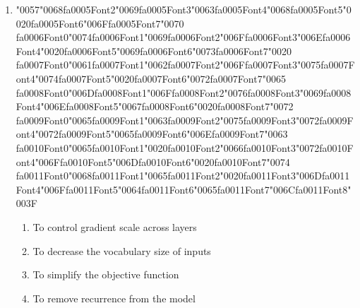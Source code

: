 \documentclass[12pt]{article}
\begin{document}
\begin{enumerate}[label=Q\arabic*.]
 \item {\char"0057}{\char"0068}{\csname fa0005Font2\endcsname\char"0069}{\csname fa0005Font3\endcsname\char"0063}{\csname fa0005Font4\endcsname\char"0068}{\csname fa0005Font5\endcsname\char"0020}{\csname fa0005Font6\endcsname\char"006F}{\csname fa0005Font7\endcsname\char"0070} {\csname fa0006Font0\endcsname\char"0074}{\csname fa0006Font1\endcsname\char"0069}{\csname fa0006Font2\endcsname\char"006F}{\csname fa0006Font3\endcsname\char"006E}{\csname fa0006Font4\endcsname\char"0020}{\csname fa0006Font5\endcsname\char"0069}{\csname fa0006Font6\endcsname\char"0073}{\csname fa0006Font7\endcsname\char"0020} {\csname fa0007Font0\endcsname\char"0061}{\csname fa0007Font1\endcsname\char"0062}{\csname fa0007Font2\endcsname\char"006F}{\csname fa0007Font3\endcsname\char"0075}{\csname fa0007Font4\endcsname\char"0074}{\csname fa0007Font5\endcsname\char"0020}{\csname fa0007Font6\endcsname\char"0072}{\csname fa0007Font7\endcsname\char"0065} {\csname fa0008Font0\endcsname\char"006D}{\csname fa0008Font1\endcsname\char"006F}{\csname fa0008Font2\endcsname\char"0076}{\csname fa0008Font3\endcsname\char"0069}{\csname fa0008Font4\endcsname\char"006E}{\csname fa0008Font5\endcsname\char"0067}{\csname fa0008Font6\endcsname\char"0020}{\csname fa0008Font7\endcsname\char"0072} {\csname fa0009Font0\endcsname\char"0065}{\csname fa0009Font1\endcsname\char"0063}{\csname fa0009Font2\endcsname\char"0075}{\csname fa0009Font3\endcsname\char"0072}{\csname fa0009Font4\endcsname\char"0072}{\csname fa0009Font5\endcsname\char"0065}{\csname fa0009Font6\endcsname\char"006E}{\csname fa0009Font7\endcsname\char"0063} {\csname fa0010Font0\endcsname\char"0065}{\csname fa0010Font1\endcsname\char"0020}{\csname fa0010Font2\endcsname\char"0066}{\csname fa0010Font3\endcsname\char"0072}{\csname fa0010Font4\endcsname\char"006F}{\csname fa0010Font5\endcsname\char"006D}{\csname fa0010Font6\endcsname\char"0020}{\csname fa0010Font7\endcsname\char"0074} {\csname fa0011Font0\endcsname\char"0068}{\csname fa0011Font1\endcsname\char"0065}{\csname fa0011Font2\endcsname\char"0020}{\csname fa0011Font3\endcsname\char"006D}{\csname fa0011Font4\endcsname\char"006F}{\csname fa0011Font5\endcsname\char"0064}{\csname fa0011Font6\endcsname\char"0065}{\csname fa0011Font7\endcsname\char"006C}{\csname fa0011Font8\endcsname\char"003F}
 \begin{enumerate}[label=(\Alph*)]
     \item To control gradient scale across layers
     \item To decrease the vocabulary size of inputs
     \item To simplify the objective function
     \item To remove recurrence from the model
 \end{enumerate}
 

\end{enumerate}
\end{document}
